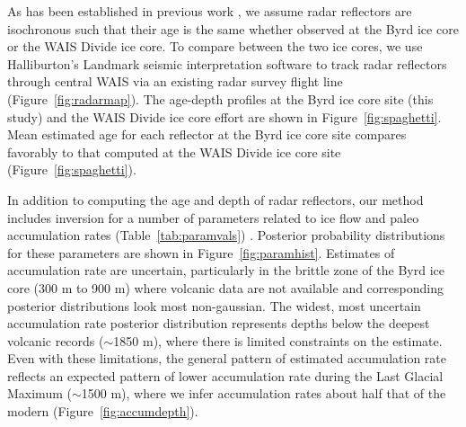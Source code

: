 As has been established in previous work \citep{siegert1998,dowdeswell2004}, we assume radar reflectors are isochronous such that their age is the same whether observed at the Byrd ice core or the WAIS Divide ice core. To compare between the two ice cores, we use Halliburton's Landmark seismic interpretation software to track radar reflectors through central WAIS via an existing radar survey flight line (Figure~\ref{fig:radarmap}). The age-depth profiles at the Byrd ice core site (this study) and the WAIS Divide ice core effort \citep{buizert2015} are shown in Figure~\ref{fig:spaghetti}. Mean estimated age for each reflector at the Byrd ice core site compares favorably to that computed at the WAIS Divide ice core site (Figure~\ref{fig:spaghetti}).  

In addition to computing the age and depth of radar reflectors, our method includes inversion for a number of parameters related to ice flow and paleo accumulation rates (Table~\ref{tab:paramvals}) . Posterior probability distributions for these parameters are shown in Figure~\ref{fig:paramhist}. Estimates of accumulation rate are uncertain, particularly in the brittle zone of the Byrd ice core (300 m to 900 m) where volcanic data are not available and corresponding posterior distributions look most non-gaussian. The widest, most uncertain accumulation rate posterior distribution represents depths below the deepest volcanic records ($\sim$1850 m), where there is limited constraints on the estimate. Even with these limitations, the general pattern of estimated accumulation rate reflects an expected pattern of lower accumulation rate during the Last Glacial Maximum ($\sim$1500 m), where we infer accumulation rates about half that of the modern (Figure~\ref{fig:accumdepth}). 

